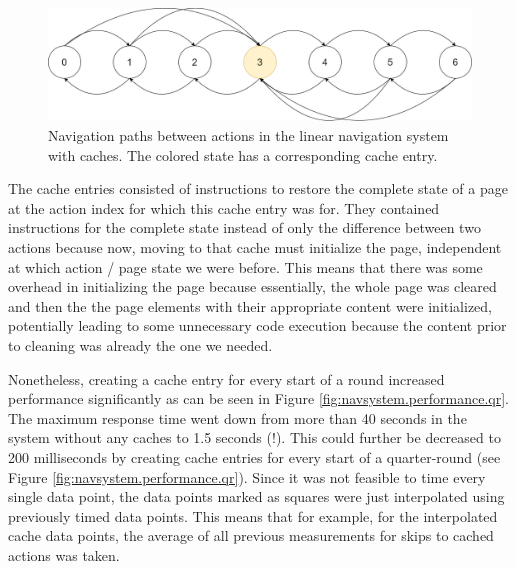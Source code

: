 \begin{figure}
\centering
\includegraphics[width=\textwidth]{figures/navigationsystem-diagram/navigationsystem-cache-overview-2.png}
\caption[Navigation paths in linear navigation system with caches]{Navigation paths between actions in the linear navigation system with caches. The colored state has a corresponding cache entry.}
\label{fig:navsystem.cache.overview}
\end{figure}

The cache entries consisted of instructions to restore the complete state of a page at the action index for which this cache entry was for. They contained instructions for the complete state instead of only the difference between two actions because now, moving to that cache must initialize the page, independent at which action / page state we were before. This means that there was some overhead in initializing the page because essentially, the whole page was cleared and then the the page elements with their appropriate content were initialized, potentially leading to some unnecessary code execution because the content prior to cleaning was already the one we needed. 

Nonetheless, creating a cache entry for every start of a round increased performance significantly as can be seen in Figure \ref{fig:navsystem.performance.qr}. The maximum response time went down from more than 40 seconds in the system without any caches to 1.5 seconds (!). This could further be decreased to 200 milliseconds by creating cache entries for every start of a quarter-round (see Figure \ref{fig:navsystem.performance.qr}). Since it was not feasible to time every single data point, the data points marked as squares were just interpolated using previously timed data points. This means that for example, for the interpolated cache data points, the average of all previous measurements for skips to cached actions was taken.

